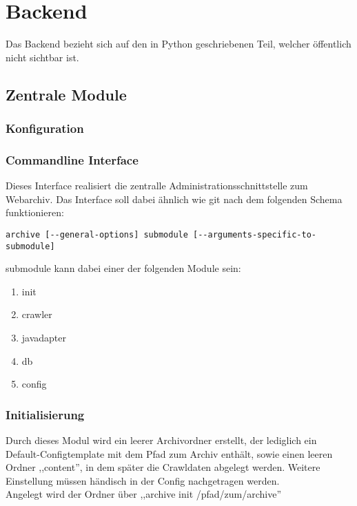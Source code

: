 \chapter{Backend}
\label{cha:backend}
Das Backend bezieht sich auf den in Python geschriebenen Teil, welcher öffentlich nicht sichtbar ist.

\section{Zentrale Module} 
\label{sec:zentrale_module}

\subsection{Konfiguration}
\label{sub:confighandler}

\subsection{Commandline Interface}
\label{sub:commandline_interface}
Dieses Interface realisiert die zentralle Administrationsschnittstelle zum Webarchiv. 
Das Interface soll dabei ähnlich wie git nach dem folgenden Schema funktionieren:
\begin{verbatim}
archive [--general-options] submodule [--arguments-specific-to-submodule]
\end{verbatim}
submodule kann dabei einer der folgenden Module sein:
\begin{enumerate}
    \item init
    \item crawler
    \item javadapter 
    \item db
    \item config
\end{enumerate}

\subsection{Initialisierung} 
\label{sub:initialisierung}
Durch dieses Modul wird ein leerer Archivordner erstellt, der lediglich
ein Default-Configtemplate mit dem Pfad zum Archiv enthält, sowie einen leeren Ordner ,,content'',
in dem später die Crawldaten abgelegt werden.
Weitere Einstellung müssen händisch in der Config nachgetragen werden.
\\
Angelegt wird der Ordner über ,,archive init /pfad/zum/archive''

